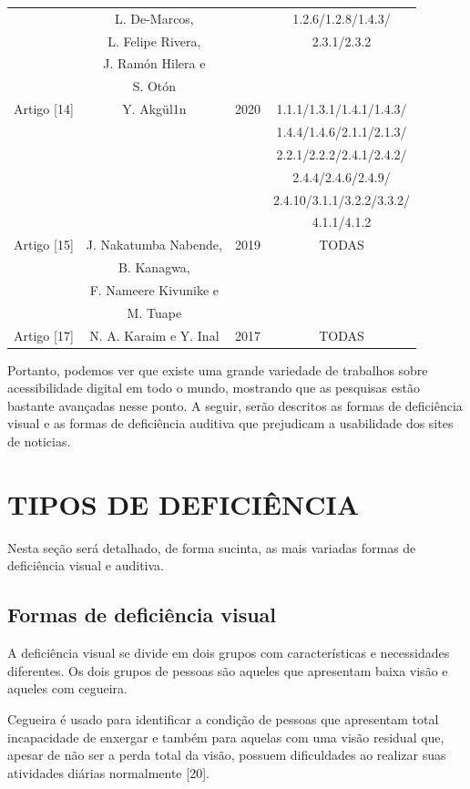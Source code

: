 \documentclass[a4paper]{article}
\begin{document}
\begin{titlepage}
\begin{center}
\begin{longtable}{|c|c|c|c|}
					& L. De-Marcos, & & 1.2.6/1.2.8/1.4.3/\\
					& L. Felipe Rivera, & & 2.3.1/2.3.2\\
					& J. Ramón Hilera e & & \\
					& S. Otón & & \\
		\hline
		Artigo [14] & Y. Akgül1n & 2020 & 1.1.1/1.3.1/1.4.1/1.4.3/\\
					& & & 1.4.4/1.4.6/2.1.1/2.1.3/\\
					& & & 2.2.1/2.2.2/2.4.1/2.4.2/\\
					& & & 2.4.4/2.4.6/2.4.9/\\
					& & & 2.4.10/3.1.1/3.2.2/3.3.2/\\
					& & & 4.1.1/4.1.2\\
		\hline
		Artigo [15] & J. Nakatumba Nabende, & 2019 & TODAS\\
					& B. Kanagwa, & &\\
					& F. Nameere Kivunike e & &\\
					& M. Tuape & &\\
		\hline
		Artigo [17] & N. A. Karaim e Y. Inal & 2017 & TODAS\\
		\hline
	\end{longtable}
\end{center}

Portanto, podemos ver que existe uma grande variedade de trabalhos sobre acessibilidade digital em todo o mundo, mostrando que as pesquisas estão bastante avançadas nesse ponto. A seguir, serão descritos as formas de deficiência visual e as formas de deficiência auditiva que prejudicam a usabilidade dos sites de noticias.

\section{TIPOS DE DEFICIÊNCIA}
Nesta seção será detalhado, de forma sucinta, as mais variadas formas de deficiência visual e auditiva.

\subsection{Formas de deficiência visual}
A deficiência visual se divide em dois grupos com características e necessidades diferentes. Os dois grupos de pessoas são aqueles que apresentam baixa visão e aqueles com cegueira.

Cegueira é usado para identificar a condição de pessoas que apresentam total incapacidade de enxergar e também para aquelas com uma visão residual que, apesar de não ser a perda total da visão, possuem dificuldades ao realizar suas atividades diárias normalmente [20].


\end{titlepage}
\end{document}
